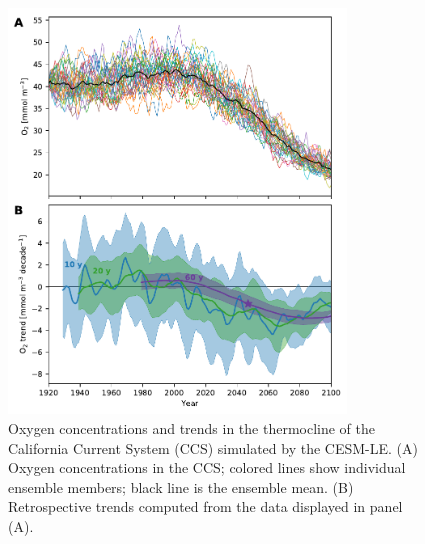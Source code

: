 \documentclass[draft,linenumbers]{report_chapter}
\begin{document}
\begin{figure}[tbp]
\centering
\includegraphics[width=0.8\textwidth]{cesm-regional-ccs-timeseries.pdf}
\caption{Oxygen concentrations and trends in the thermocline of the California Current System (CCS) simulated by the CESM-LE.
(A) Oxygen concentrations in the CCS; colored lines show individual ensemble members; black line is the ensemble mean.
(B) Retrospective trends computed from the data displayed in panel (A).}
\label{fig:ccs}
\end{figure}
\end{document}
